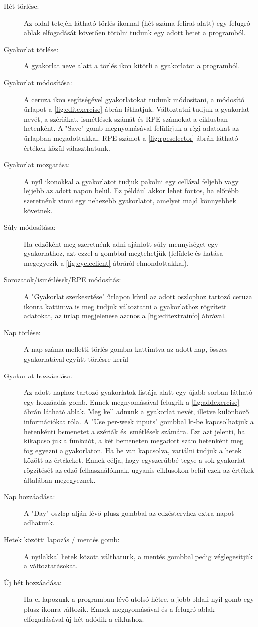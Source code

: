 \begin{description}
	\item[Hét törlése:] Az oldal tetején látható törlés ikonnal (hét száma felirat alatt) egy felugró ablak elfogadását követően törölni tudunk egy adott hetet a programból.
	\item[Gyakorlat törlése:] A gyakorlat neve alatt a törlés ikon kitörli a gyakorlatot a programból.
	\item[Gyakorlat módosítása:] A ceruza ikon segítségével gyakorlatokat tudunk módosítani, a módosító űrlapot a \ref{fig:editexercise} ábrán láthatjuk. Változtatni tudjuk a gyakorlat nevét, a szériákat, ismétlések számát és RPE számokat a ciklusban hetenként. A "Save" gomb megnyomásával felülírjuk a régi adatokat az űrlapban megadottakkal. RPE számot a \ref{fig:rpeselector} ábrán látható értékek közül választhatunk.
	\item[Gyakorlat mozgatása:] A nyíl ikonokkal a gyakorlatot tudjuk pakolni egy cellával feljebb vagy lejjebb az adott napon belül. Ez például akkor lehet fontos, ha előrébb szeretnénk vinni egy nehezebb gyakorlatot, amelyet majd könnyebbek követnek.
	\item[Súly módosítása:] Ha edzőként meg szeretnénk adni ajánlott súly mennyiséget egy gyakorlathoz, azt ezzel a gombbal megtehetjük (felülete és hatása megegyezik a \ref{fig:cycleclient} ábráról elmondottakkal).
	\item[Sorozatok/ismétlések/RPE módosítás:] A "Gyakorlat szerkesztése" űrlapon kívül az adott oszlophoz tartozó ceruza ikonra kattintva is meg tudjuk változtatni a gyakorlathoz rögzített adatokat, az űrlap megjelenése azonos a \ref{fig:editextrainfo} ábrával.
	\item[Nap törlése:] A nap száma melletti törlés gombra kattimtva az adott nap, összes gyakorlatával együtt törlésre kerül.
	\item[Gyakorlat hozzáadása:] Az adott naphoz tartozó gyakorlatok listája alatt egy újabb sorban látható egy hozzáadás gomb. Ennek megnyomásával felugrik a \ref{fig:addexercise} ábrán látható ablak. Meg kell adnunk a  gyakorlat nevét, illetve különböző információkat róla. A "Use per-week inputs" gombbal ki-be kapcsolhatjuk a hetenkénti bemenetet a szériák és ismétlések számára. Ezt azt jelenti, ha kikapcsoljuk a funkciót, a két bemeneten megadott szám hetenként meg fog egyezni a gyakorlaton. Ha be van kapcsolva, variálni tudjuk a hetek között az értékeket. Ennek célja, hogy egyszerűbbé tegye a sok gyakorlat rögzítését az edző felhasználóknak, ugyanis ciklusokon belül ezek az értékek általában megegyeznek. 
	\item[Nap hozzáadása:] A "Day" oszlop alján lévő plusz gombbal az edzéstervhez extra napot adhatunk.
	\item[Hetek közötti lapozás / mentés gomb:]  A nyilakkal hetek között válthatunk, a mentés gombbal pedig véglegesítjük a változtatásokat.
	\item[Új hét hozzáadása:] Ha el lapozunk a programban lévő utolsó hétre, a jobb oldali nyíl gomb egy plusz ikonra változik. Ennek megnyomásával és a felugró ablak elfogadásával új hét adódik a ciklushoz. 
\end{description}

